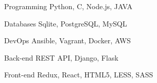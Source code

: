 

\begin{cvskills}

  \cvskill
    {Programming} %
    {Python, C, Node.js, JAVA} %

  \cvskill
    {Databases} %
    {Sqlite, PostgreSQL, MySQL} %

  \cvskill
    {DevOps} %
    {Ansible, Vagrant, Docker, AWS} %

  \cvskill
    {Back-end} %
    {REST API, Django, Flask} %

  \cvskill
    {Front-end} %
    {Redux, React, HTML5, LESS, SASS} %


\end{cvskills}
